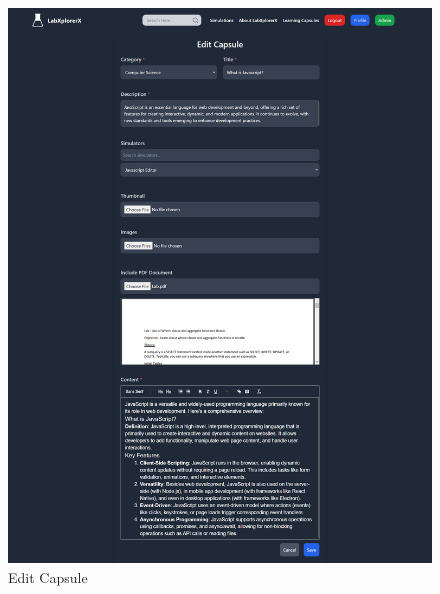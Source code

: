 \begin{figure}[H]
    \centering
    \includegraphics[width = 16cm]{Diagrams/output/edit_capsule.png}
    \caption{Edit Capsule}
\end{figure}

